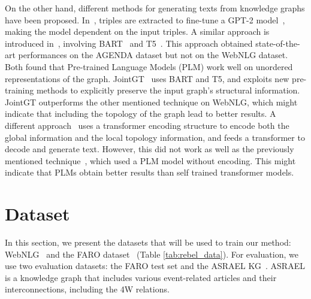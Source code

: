 \documentclass[
hf, %
]{ceurart}
\begin{document}
On the other hand, different methods for generating texts from knowledge graphs have been proposed. In~\cite{creative_story}, triples are extracted to fine-tune a GPT-2 model~\cite{GPT-2}, making the model dependent on the input triples. A similar approach is introduced in~\cite{inv_PLM}, involving BART~\cite{BART} and T5~\cite{T5}. This approach obtained state-of-the-art performances on the AGENDA dataset \cite{AGENDA_KG} but not on the WebNLG dataset. Both found that Pre-trained Language Models (PLM) work well on unordered representations of the graph. JointGT~\cite{JointGT} uses BART and T5, and exploits new pre-training methods to explicitly preserve the input graph's structural information. JointGT outperforms the other mentioned technique on WebNLG, which might indicate that including the topology of the graph lead to better results. A different approach~\cite{DRAW} uses a transformer encoding structure to encode both the global information and the local topology information, and feeds a transformer to decode and generate text. However, this did not work as well as the previously mentioned technique~\cite{inv_PLM}, which used a PLM model without encoding. This might indicate that PLMs obtain better results than self trained transformer models.

\section{Dataset}
\label{sec:dataset}
In this section, we present the datasets that will be used to train our method: WebNLG~\cite{WebNLG} and the FARO dataset~\cite{sem_data_aug} (Table \ref{tab:rebel_data}). For evaluation, we use two evaluation datasets: the FARO test set and the ASRAEL KG~\cite{ASRAEL}. ASRAEL is a knowledge graph that includes various event-related articles and their interconnections, including the 4W relations.

\begin{table}[htbp]
	\caption{Sample of the FARO dataset}
	\label{tab:rebel_data}
\end{table}
\end{document}
